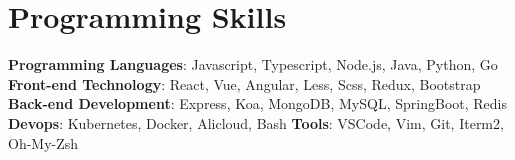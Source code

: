 \documentclass[letterpaper,11pt]{article}
\newcommand{\resumeSubHeadingListStart}{\begin{itemize}[leftmargin=*]\vspace{4pt}}
\newcommand{\resumeSubHeadingListEnd}{\end{itemize}}
\begin{document}
\section{Programming Skills}
  \resumeSubHeadingListStart
    \textbf{Programming Languages}{: Javascript, Typescript, Node.js, Java, Python, Go}
    \newline
    \textbf{Front-end Technology}{: React, Vue, Angular, Less, Scss, Redux, Bootstrap }
    \newline
    {\textbf{Back-end Development}}{: Express, Koa, MongoDB, MySQL, SpringBoot, Redis}
    \newline
    {\textbf{Devops}}{: Kubernetes, Docker, Alicloud, Bash }
    \newline
    \textbf{Tools}{: VSCode, Vim, Git, Iterm2, Oh-My-Zsh}
\resumeSubHeadingListEnd
\end{document}
